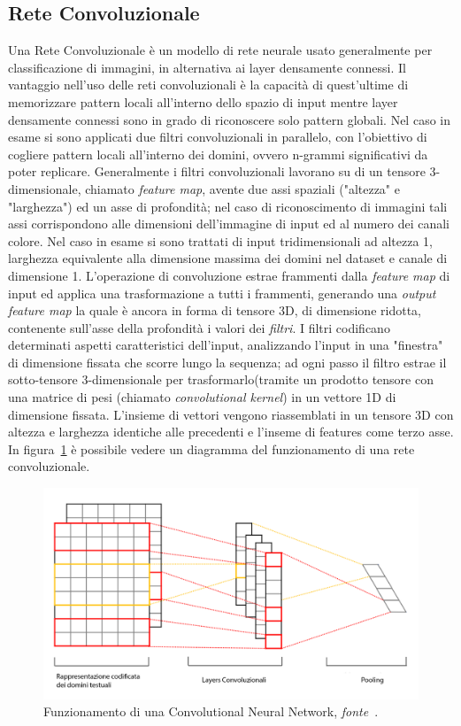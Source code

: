 \subsection{Rete Convoluzionale}
Una Rete Convoluzionale è un modello di rete neurale usato generalmente per classificazione di immagini, in alternativa ai layer densamente connessi. Il vantaggio nell'uso delle reti convoluzionali è la capacità di quest'ultime di memorizzare pattern locali all'interno dello spazio di input mentre layer densamente connessi sono in grado di riconoscere solo pattern globali. Nel caso in esame si sono applicati due filtri convoluzionali in parallelo, con l'obiettivo di cogliere pattern locali all'interno dei domini, ovvero n-grammi significativi da poter replicare. Generalmente i filtri convoluzionali lavorano su di un tensore 3-dimensionale, chiamato \textit{feature map}, avente due assi spaziali ("altezza" e "larghezza") ed un asse di profondità; nel caso di riconoscimento di immagini tali assi corrispondono alle dimensioni dell'immagine di input ed al numero dei canali colore. Nel caso in esame si sono trattati di input tridimensionali ad altezza 1, larghezza equivalente alla dimensione massima dei domini nel dataset e canale di dimensione 1. L'operazione di convoluzione estrae frammenti dalla \textit{feature map} di input ed applica una trasformazione a tutti i frammenti, generando una \textit{output feature map} la quale è ancora in forma di tensore 3D, di dimensione ridotta, contenente sull'asse della profondità i valori dei \textit{filtri}. I filtri codificano determinati aspetti caratteristici dell'input, analizzando l'input in una "finestra" di dimensione fissata che scorre lungo la sequenza; ad ogni passo il filtro estrae il sotto-tensore 3-dimensionale per trasformarlo(tramite un prodotto tensore con una matrice di pesi (chiamato \textit{convolutional kernel}) in un vettore 1D di dimensione fissata. L'insieme di vettori vengono riassemblati in un tensore 3D con altezza e larghezza identiche alle precedenti e l'inseme di features come terzo asse. In figura~\ref{fig:cnn} è possibile vedere un diagramma del funzionamento di una rete convoluzionale.

\begin{figure}[!bp]
    \centering
	\includegraphics[width=\columnwidth]{figures/CNN.png}
	\caption{Funzionamento di una Convolutional Neural Network,\textit{ fonte}~\cite{fig:cnnfonte}.
\label{fig:cnn}}
\end{figure}


